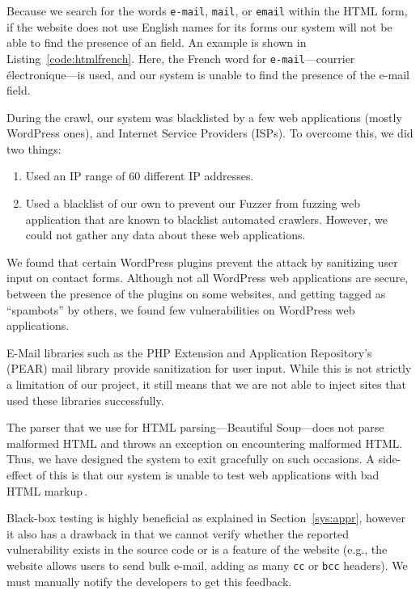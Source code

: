         Because we search for the words \texttt{e-mail}, \texttt{mail}, or \texttt{email} within the HTML form, if the website does not use English names for its forms our system will not be able to find the presence of an \email field. An example is shown in Listing~\ref{code:htmlfrench}. Here, the French word for \texttt{e-mail}---courrier électronique---is used, and our system is unable to find the presence of the e-mail field. 
        
		During the crawl, our system was blacklisted by a few web applications (mostly WordPress ones), and Internet Service Providers (ISPs).
		To overcome this, we did two things:
		\begin{enumerate}
			\item Used an IP range of 60 different IP addresses.
			\item Used a blacklist of our own to prevent our Fuzzer from fuzzing web application that are known to blacklist automated crawlers.  However, we could not gather any data about these web applications.
		\end{enumerate}

		We found that certain WordPress plugins prevent the \ehi attack by sanitizing user input on contact forms. Although not all  WordPress web applications are secure, between the presence of the plugins on some websites, and getting tagged as ``spambots'' by others, we found few vulnerabilities on WordPress web applications.

        E-Mail libraries such as the PHP Extension and Application Repository's (PEAR) mail library provide sanitization for user input. While this is not strictly a limitation of our project, it still means that we are not able to inject sites that used these libraries successfully.

        The parser that we use for HTML parsing---Beautiful Soup---does not parse malformed HTML and throws an exception on encountering malformed HTML. Thus, we have designed the system to exit gracefully on such occasions. A side-effect of this is that our system is unable to test web applications with bad HTML markup\,\footnotemark.


        Black-box testing is highly beneficial as explained in Section~\ref{sys:appr}, however it also has a drawback in that we cannot verify whether the reported vulnerability exists in the source code or is a feature of the website (e.g., the website allows users to send bulk e-mail, adding as many \texttt{cc} or \texttt{bcc} headers). We must manually notify the developers to get this feedback.

